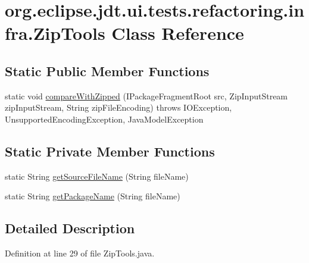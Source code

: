 \hypertarget{classorg_1_1eclipse_1_1jdt_1_1ui_1_1tests_1_1refactoring_1_1infra_1_1ZipTools}{
\section{org.eclipse.jdt.ui.tests.refactoring.infra.ZipTools Class Reference}
\label{classorg_1_1eclipse_1_1jdt_1_1ui_1_1tests_1_1refactoring_1_1infra_1_1ZipTools}
}
\subsection*{Static Public Member Functions}
\begin{DoxyCompactItemize}
\item 
static void \hyperlink{classorg_1_1eclipse_1_1jdt_1_1ui_1_1tests_1_1refactoring_1_1infra_1_1ZipTools_ab5a21aa969eee5c28e0e37abdb2e7f83}{compareWithZipped} (IPackageFragmentRoot src, ZipInputStream zipInputStream, String zipFileEncoding)  throws IOException, UnsupportedEncodingException, JavaModelException 
\end{DoxyCompactItemize}
\subsection*{Static Private Member Functions}
\begin{DoxyCompactItemize}
\item 
static String \hyperlink{classorg_1_1eclipse_1_1jdt_1_1ui_1_1tests_1_1refactoring_1_1infra_1_1ZipTools_a552daafdf3b6794d0ac4dbceb36ed3a6}{getSourceFileName} (String fileName)
\item 
static String \hyperlink{classorg_1_1eclipse_1_1jdt_1_1ui_1_1tests_1_1refactoring_1_1infra_1_1ZipTools_ad00a2dd5fed67d5c7504147a58559232}{getPackageName} (String fileName)
\end{DoxyCompactItemize}


\subsection{Detailed Description}


Definition at line 29 of file ZipTools.java.




